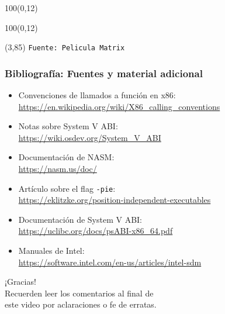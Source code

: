 \documentclass[aspectratio=169]{beamer}
\begin{document}
\begin{frame}[plain]
    \begin{textblock}{100}(0,12)
    \end{textblock}
    \begin{textblock}{100}(0,12)
    \end{textblock}
    \begin{textblock}{55}(3,85)
    \scriptsize
    \texttt{Fuente: Pelicula Matrix}
    \end{textblock}
\end{frame}

\begin{frame}[fragile]
    \frametitle{Bibliografía: Fuentes y material adicional}
    \begin{itemize}
    \item Convenciones de llamados a función en x86: \\
    \url{https://en.wikipedia.org/wiki/X86_calling_conventions}
    \item Notas sobre System V ABI: \\
    \url{https://wiki.osdev.org/System_V_ABI}
    \item Documentación de NASM: \\
    \url{https://nasm.us/doc/}
    \item Artículo sobre el flag \texttt{-pie}: \\
    \url{https://eklitzke.org/position-independent-executables}
    \item Documentación de System V ABI: \\
    \url{https://uclibc.org/docs/psABI-x86_64.pdf}
    \item Manuales de Intel: \\
    \url{https://software.intel.com/en-us/articles/intel-sdm}
    \end{itemize}
\end{frame}

\begin{frame}[plain]
\begin{center}
\vspace{2cm}
\huge ¡Gracias!\\
\vspace{2cm}
\normalsize Recuerden leer los comentarios al final de \\ este video por aclaraciones o fe de erratas.
\end{center}
\end{frame}
\end{document}
